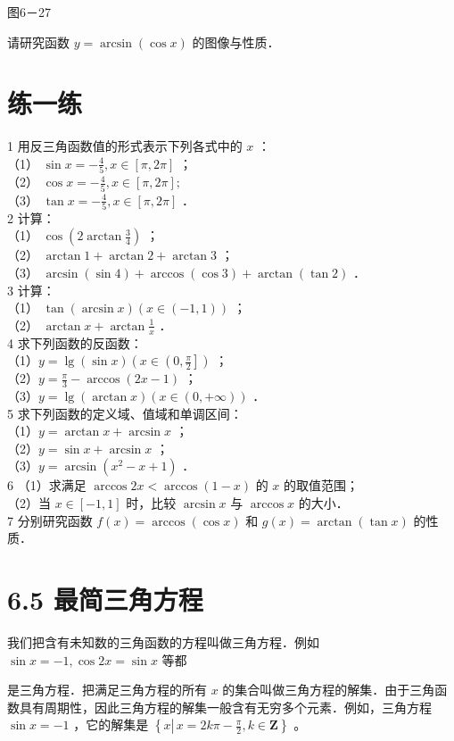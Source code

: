 \documentclass[10pt]{article}
\begin{document}
图6－27

请研究函数 \(y=\arcsin (\cos x)\) 的图像与性质．

\section*{练一练}
1 用反三角函数值的形式表示下列各式中的 \(x\) ：\\
（1） \(\sin x=-\frac{4}{5}, x \in[\pi, 2 \pi]\) ；\\
（2） \(\cos x=-\frac{4}{5}, x \in[\pi, 2 \pi] ;\)\\
（3） \(\tan x=-\frac{4}{5}, x \in[\pi, 2 \pi]\) ．\\
2 计算：\\
（1） \(\cos \left(2 \arctan \frac{3}{4}\right)\) ；\\
（2） \(\arctan 1+\arctan 2+\arctan 3\) ；\\
（3） \(\arcsin (\sin 4)+\arccos (\cos 3)+\arctan (\tan 2)\) ．\\
3 计算：\\
（1） \(\tan (\arcsin x)(x \in(-1,1))\) ；\\
（2） \(\arctan x+\arctan \frac{1}{x}\) ．\\
4 求下列函数的反函数：\\
（1）\(y=\lg (\sin x)\left(x \in\left(0, \frac{\pi}{2}\right]\right)\) ；\\
（2）\(y=\frac{\pi}{3}-\arccos (2 x-1)\) ；\\
（3）\(y=\lg (\arctan x)(x \in(0,+\infty))\) ．\\
5 求下列函数的定义域、值域和单调区间：\\
（1）\(y=\arctan x+\arcsin x\) ；\\
（2）\(y=\sin x+\arcsin x\) ；\\
（3）\(y=\arcsin \left(x^{2}-x+1\right)\) ．\\
6 （1）求满足 \(\arccos 2 x<\arccos (1-x)\) 的 \(x\) 的取值范围；\\
（2）当 \(x \in[-1,1]\) 时，比较 \(\arcsin x\) 与 \(\arccos x\) 的大小．\\
7 分别研究函数 \(f(x)=\arccos (\cos x)\) 和 \(g(x)=\arctan (\tan x)\) 的性质．

\section*{6.5 最简三角方程}
我们把含有未知数的三角函数的方程叫做三角方程．例如 \(\sin x=-1, \cos 2 x=\sin x\) 等都

是三角方程．把满足三角方程的所有 \(x\) 的集合叫做三角方程的解集．由于三角函数具有周期性，因此三角方程的解集一般含有无穷多个元素．例如，三角方程 \(\sin x=-1\) ，它的解集是 \(\left\{x \left\lvert\, x=2 k \pi-\frac{\pi}{2}\right., k \in \mathbf{Z}\right\}\) 。
\end{document}
